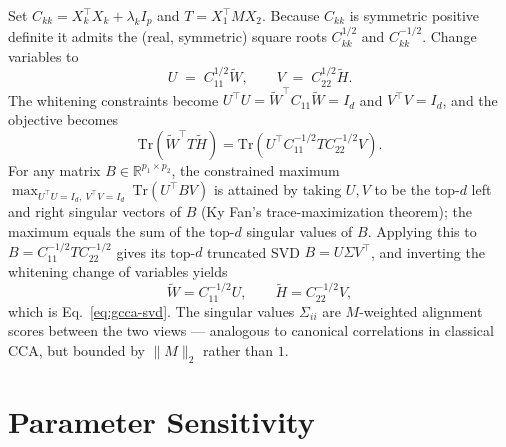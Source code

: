 \documentclass{article}
\begin{document}
Set $C_{kk} = X_k^\top X_k + \lambda_k I_p$ and $T = X_1^\top M X_2$.
Because $C_{kk}$ is symmetric positive definite it admits the (real,
symmetric) square roots $C_{kk}^{1/2}$ and $C_{kk}^{-1/2}$. Change
variables to
\[
U \;=\; C_{11}^{1/2} \widetilde{W}, \qquad
V \;=\; C_{22}^{1/2} \widetilde{H}.
\]
The whitening constraints become
$U^\top U = \widetilde{W}^\top C_{11} \widetilde{W} = I_d$ and $V^\top V = I_d$,
and the objective becomes
\begin{equation*}
\mathrm{Tr}\!\left(\widetilde{W}^\top T \widetilde{H}\right)
= \mathrm{Tr}\!\left(U^\top C_{11}^{-1/2} T C_{22}^{-1/2} V\right).
\end{equation*}
For any matrix $B \in \mathbb{R}^{p_1 \times p_2}$, the constrained
maximum
$\max_{U^\top U = I_d,\ V^\top V = I_d}\ \mathrm{Tr}(U^\top B V)$
is attained by taking $U, V$ to be the top-$d$ left and right singular
vectors of $B$ (Ky Fan's trace-maximization theorem); the maximum equals
the sum of the top-$d$ singular values of $B$. Applying this to
$B = C_{11}^{-1/2} T C_{22}^{-1/2}$ gives its top-$d$ truncated SVD
$B = U \Sigma V^\top$, and inverting the whitening change of variables
yields
\[
\widetilde{W} = C_{11}^{-1/2} U, \qquad
\widetilde{H} = C_{22}^{-1/2} V,
\]
which is Eq.~\ref{eq:gcca-svd}. The singular values $\Sigma_{ii}$ are
$M$-weighted alignment scores between the two views --- analogous to
canonical correlations in classical CCA, but bounded by $\|M\|_2$ rather
than $1$.

\section{Parameter Sensitivity}
\label{app:sensitivity}
\end{document}

